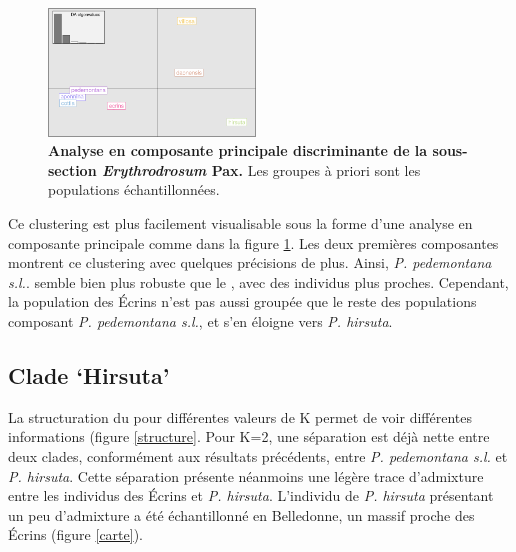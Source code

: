 \begin{figure}
	\vspace{-20pt}
	\begin{center}
    \includegraphics[width=0.49\textwidth]{fig/DAPC.png}
    \caption{\textbf{Analyse en composante principale discriminante de la sous-section \textit{Erythrodrosum} Pax.} Les groupes à priori sont les populations échantillonnées.}
    \end{center}
    \label{DAPC}
    \vspace{-20pt}
\end{figure}

Ce clustering est plus facilement visualisable sous la forme d'une analyse en composante principale comme dans la figure \ref{DAPC}. Les deux premières composantes montrent ce clustering avec quelques précisions de plus. Ainsi, \textit{P. pedemontana s.l.}. semble bien plus robuste que le , avec des individus plus proches. Cependant, la population des Écrins n'est pas aussi groupée que le reste des populations composant \textit{P. pedemontana s.l.}, et s'en éloigne vers \textit{P. hirsuta}.

\subsection{Clade `Hirsuta'}

La structuration du  pour différentes valeurs de K permet de voir différentes informations (figure \ref{structure}. Pour K=2, une séparation est déjà nette entre deux clades, conformément aux résultats précédents, entre \textit{P. pedemontana s.l.} et \textit{P. hirsuta}. Cette séparation présente néanmoins une légère trace d'admixture entre les individus des Écrins et \textit{P. hirsuta}. L'individu de \textit{P. hirsuta} présentant un peu d'admixture a été échantillonné en Belledonne, un massif proche des Écrins (figure \ref{carte}).

